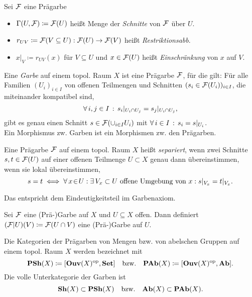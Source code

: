 \documentclass{cheat-sheet}
\begin{document}
\begin{nota}
  Sei $\mathcal{F}$ eine Prägarbe
  \begin{itemize}
    \item $\Gamma(U, \mathcal{F}) \coloneqq \mathcal{F}(U)$ heißt Menge der \emph{Schnitte} von $\mathcal{F}$ über $U$.
    \item $r_{UV} \coloneqq \mathcal{F}(V \subseteq U) : \mathcal{F}(U) \to \mathcal{F}(V)$ heißt \emph{Restriktionsabb}.
    \item $x|_V \coloneqq r_{UV}(x)$ für $V \subseteq U$ und $x \in \mathcal{F}(U)$ heißt \emph{Einschränkung} von $x$ auf $V$.
  \end{itemize}
\end{nota}

\begin{defn}
  Eine \emph{Garbe} auf einem topol. Raum $X$ ist eine Prägarbe $\mathcal{F}$, für die gilt:
  Für alle Familien $(U_i)_{i \in I}$ von offenen Teilmengen und Schnitten $(s_i \in \mathcal{F}(U_i))_{i \in I}$, die miteinander kompatibel sind, \dh{}
  \[ \forall \, {i, j \in I} \,:\, s_i|_{U_i \cap U_j} = s_j|_{U_i \cap U_j}, \]
  gibt es genau einen Schnitt $s \in \mathcal{F}(\cup_{i \in I} U_i)$ mit $\forall \, {i \in I} \,:\, s_i = s|_{U_i}$.\\
  Ein Morphismus zw. Garben ist ein Morphismen zw. den Prägarben.
\end{defn}

\begin{defn}
  Eine Prägarbe $\mathcal{F}$ auf einem topol. Raum $X$ heißt \emph{separiert}, wenn zwei Schnitte $s, t \in \mathcal{F}(U)$ auf einer offenen Teilmenge $U \subset X$ genau dann übereinstimmen, wenn sie lokal übereinstimmen, \dh{}
  \[ s = t \iff \forall \, {x \!\in\! U\!} \,:\,\! \exists \, {V_x \subset U \text{ offene Umgebung von $x$}\!} \,:\,\! s|_{V_x} = t|_{V_x}. \]
\end{defn}

\begin{bem}
  Das entspricht dem Eindeutigkeitsteil im Garbenaxiom.
\end{bem}

\begin{bem}
  Sei $\mathcal{F}$ eine (Prä-)Garbe auf $X$ und $U \subseteq X$ offen. Dann definiert $(\mathcal{F}|U)(V) \coloneqq \mathcal{F}(U \cap V)$ eine (Prä-)Garbe auf $U$.
\end{bem}

\begin{nota}
  Die Kategorien der Prägarben von Mengen bzw. von abelschen Gruppen auf einem topol. Raum $X$ werden bezeichnet mit
  \[
    \mathbf{PSh}(X) \coloneqq [\mathbf{Ouv}(X)^{\mathrm{op}}, \mathbf{Set}]
    \quad \text{bzw.} \quad
    \mathbf{PAb}(X) \coloneqq [\mathbf{Ouv}(X)^{\mathrm{op}}, \mathbf{Ab}].
  \]
  Die volle Unterkategorie der Garben ist
  \[
    \mathbf{Sh}(X) \subset \mathbf{PSh}(X)
    \quad \text{bzw.} \quad
    \mathbf{Ab}(X) \subset \mathbf{PAb}(X).
  \]
\end{nota}
\end{document}
